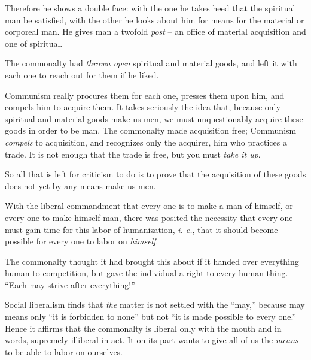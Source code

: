 \documentclass[12pt,a4paper]{book}
\begin{document}
Therefore he shows a double face: with the one he takes heed that the 
spiritual man be satisfied, with the other he looks about him for means for 
the material or corporeal man. He gives man a twofold \textit{post} -- an 
office of material acquisition and one of spiritual.

The commonalty had \textit{thrown open} spiritual and material goods, and left 
it with each one to reach out for them if he liked.

Communism really procures them for each one, presses them upon him, and 
compels him to acquire them. It takes seriously the idea that, because only 
spiritual and material goods make us men, we must unquestionably acquire these 
goods in order to be man. The commonalty made acquisition free; Communism 
\textit{compels} to acquisition, and recognizes only the acquirer, him who 
practices a trade. It is not enough that the trade is free, but you must 
\textit{take it up}.

So all that is left for criticism to do is to prove that the acquisition of 
these goods does not yet by any means make us men.

With the liberal commandment that every one is to make a man of himself, or 
every one to make himself man, there was posited the necessity that every one 
must gain time for this labor of humanization, \textit{i. e.}, that it should 
become possible for every one to labor on \textit{himself}.

The commonalty thought it had brought this about if it handed over everything 
human to competition, but gave the individual a right to every human thing. 
``Each may strive after everything!''

Social liberalism finds that \textit{the} matter is not settled with the 
``may,'' because may means only ``it is forbidden to none'' but not ``it 
is made possible to every one.'' Hence it affirms that the commonalty is 
liberal only with the mouth and in words, supremely illiberal in act. It on 
its part wants to give all of us the \textit{means} to be able to labor on 
ourselves.
\end{document}
